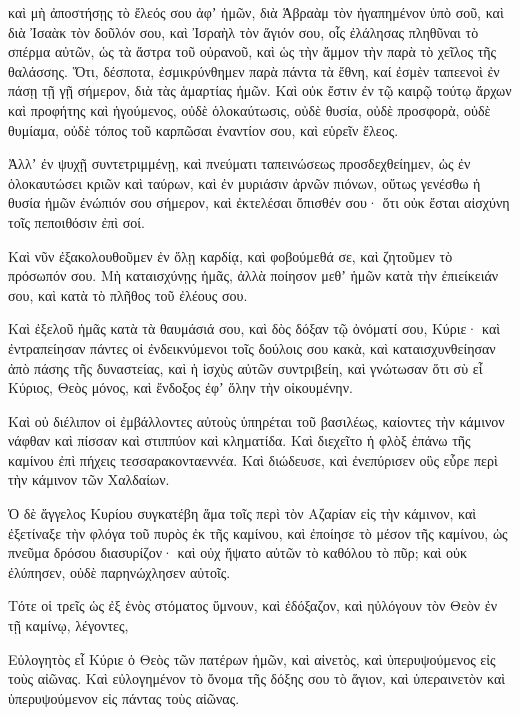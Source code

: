 {καὶ μὴ ἀποστήσῃς τὸ ἔλεός σου ἀφʼ ἡμῶν, διὰ Ἁβραὰμ τὸν ἠγαπημένον ὑπὸ σοῦ, καὶ διὰ Ἰσαὰκ τὸν δοῦλόν σου, καὶ Ἰσραὴλ τὸν ἅγιόν σου,
οἷς ἐλάλησας πληθῦναι τὸ σπέρμα αὐτῶν, ὡς τὰ ἄστρα τοῦ οὐρανοῦ, καὶ ὡς τὴν ἄμμον τὴν παρὰ τὸ χεῖλος τῆς θαλάσσης.
Ὅτι, δέσποτα, ἐσμικρύνθημεν παρὰ πάντα τὰ ἔθνη, καί ἐσμὲν ταπεενοὶ ἐν πάσῃ τῇ γῇ σήμερον, διὰ τὰς ἁμαρτίας ἡμῶν.
Καὶ οὐκ ἔστιν ἐν τῷ καιρῷ τούτῳ ἄρχων καὶ προφήτης καὶ ἡγούμενος, οὐδὲ ὁλοκαύτωσις, οὐδὲ θυσία, οὐδὲ προσφορὰ, οὐδὲ θυμίαμα, οὐδὲ τόπος τοῦ καρπῶσαι ἐναντίον σου, καὶ εὑρεῖν ἕλεος.
\par }{\PP {}Ἀλλʼ ἐν ψυχῇ συντετριμμένῃ, καὶ πνεύματι ταπεινώσεως προσδεχθείημεν, ὡς ἐν ὁλοκαυτώσει κριῶν καὶ ταύρων, καὶ ἐν μυριάσιν ἀρνῶν πιόνων,
οὕτως γενέσθω ἡ θυσία ἡμῶν ἐνώπιόν σου σήμερον, καὶ ἐκτελέσαι ὄπισθέν σου· ὅτι οὐκ ἔσται αἰσχύνη τοῖς πεποιθόσιν ἐπὶ σοί.
\par }{\PP {}Καὶ νῦν ἐξακολουθοῦμεν ἐν ὅλῃ καρδίᾳ, καὶ φοβούμεθά σε, καὶ ζητοῦμεν τὸ πρόσωπόν σου. Μὴ καταισχύνῃς ἡμᾶς,
ἀλλὰ ποίησον μεθʼ ἡμῶν κατὰ τὴν ἐπιείκειάν σου, καὶ κατὰ τὸ πλῆθος τοῦ ἐλέους σου.
\par }{\PP {}Καὶ ἐξελοῦ ἡμᾶς κατὰ τὰ θαυμάσιά σου, καὶ δὸς δόξαν τῷ ὀνόματί σου, Κύριε·
καὶ ἐντραπείησαν πάντες οἱ ἐνδεικνύμενοι τοῖς δούλοις σου κακὰ, καὶ καταισχυνθείησαν ἀπὸ πάσης τῆς δυναστείας, καὶ ἡ ἰσχὺς αὐτῶν συντριβείη,
καὶ γνώτωσαν ὅτι σὺ εἶ Κύριος, Θεὸς μόνος, καὶ ἔνδοξος ἐφʼ ὅλην τὴν οἰκουμένην.
\par }{\PP {}Καὶ οὐ διέλιπον οἱ ἐμβάλλοντες αὐτοὺς ὑπηρέται τοῦ βασιλέως, καίοντες τὴν κάμινον νάφθαν καὶ πίσσαν καὶ στιππύον καὶ κληματίδα.
Καὶ διεχεῖτο ἡ φλὸξ ἐπάνω τῆς καμίνου ἐπὶ πήχεις τεσσαρακονταεννέα.
Καὶ διώδευσε, καὶ ἐνεπύρισεν οὓς εὗρε περὶ τὴν κάμινον τῶν Χαλδαίων.
\par }{\PP {}Ὁ δὲ ἄγγελος Κυρίου συγκατέβη ἅμα τοῖς περὶ τὸν Αζαρίαν εἰς τὴν κάμινον, καὶ ἐξετίναξε τὴν φλόγα τοῦ πυρὸς ἐκ τῆς καμίνου,
καὶ ἐποίησε τὸ μέσον τῆς καμίνου, ὡς πνεῦμα δρόσου διασυρίζον· καὶ οὐχ ἥψατο αὐτῶν τὸ καθόλου τὸ πῦρ; καὶ οὐκ ἐλύπησεν, οὐδὲ παρηνώχλησεν αὐτοῖς.
\par }{\PP {}Τότε οἱ τρεῖς ὡς ἐξ ἑνὸς στόματος ὕμνουν, καὶ ἐδόξαζον, καὶ ηὐλόγουν τὸν Θεὸν ἐν τῇ καμίνῳ, λέγοντες,
\par }{\PP {}Εὐλογητὸς εἶ Κύριε ὁ Θεὸς τῶν πατέρων ἡμῶν, καὶ αἰνετὸς, καὶ ὑπερυψούμενος εἰς τοὺς αἰῶνας. Καὶ εὐλογημένον τὸ ὄνομα τῆς δόξης σου τὸ ἅγιον, καὶ ὑπεραινετὸν καὶ ὑπερυψούμενον εἰς πάντας τοὺς αἰῶνας.
}
